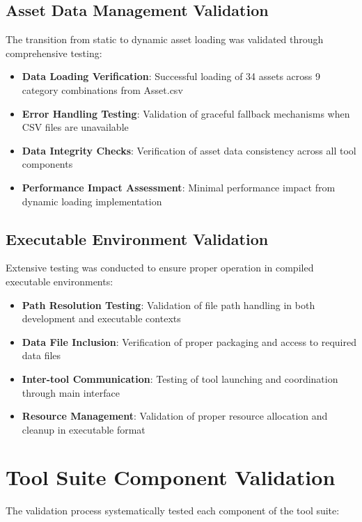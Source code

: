 \documentclass[binding=0.6cm]{sapthesis}
\begin{document}
\subsection{Asset Data Management Validation}

The transition from static to dynamic asset loading was validated through comprehensive testing:

\begin{itemize}
    \item \textbf{Data Loading Verification}: Successful loading of 34 assets across 9 category combinations from Asset.csv
    \item \textbf{Error Handling Testing}: Validation of graceful fallback mechanisms when CSV files are unavailable
    \item \textbf{Data Integrity Checks}: Verification of asset data consistency across all tool components
    \item \textbf{Performance Impact Assessment}: Minimal performance impact from dynamic loading implementation
\end{itemize}

\subsection{Executable Environment Validation}

Extensive testing was conducted to ensure proper operation in compiled executable environments:

\begin{itemize}
    \item \textbf{Path Resolution Testing}: Validation of file path handling in both development and executable contexts
    \item \textbf{Data File Inclusion}: Verification of proper packaging and access to required data files
    \item \textbf{Inter-tool Communication}: Testing of tool launching and coordination through main interface
    \item \textbf{Resource Management}: Validation of proper resource allocation and cleanup in executable format
\end{itemize}

\section{Tool Suite Component Validation}

The validation process systematically tested each component of the tool suite:
\end{document}
